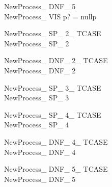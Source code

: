 \documentclass{article}
\begin{document}
\begin{multicols}{2}
\begin{schema}{NewProcess\_ DNF\_ 5}\\
NewProcess\_ VIS 
\where
p? = nullp
\end{schema}

\begin{schema}{NewProcess\_ SP\_ 2\_ TCASE}\\
NewProcess\_ SP\_ 2
\end{schema}

\begin{schema}{NewProcess\_ DNF\_ 2\_ TCASE}\\
NewProcess\_ DNF\_ 2
\end{schema}

\begin{schema}{NewProcess\_ SP\_ 3\_ TCASE}\\
NewProcess\_ SP\_ 3
\end{schema}

\begin{schema}{NewProcess\_ SP\_ 4\_ TCASE}\\
NewProcess\_ SP\_ 4
\end{schema}

\begin{schema}{NewProcess\_ DNF\_ 4\_ TCASE}\\
NewProcess\_ DNF\_ 4
\end{schema}

\begin{schema}{NewProcess\_ DNF\_ 5\_ TCASE}\\
NewProcess\_ DNF\_ 5
\end{schema}

\end{multicols}
\end{document}
